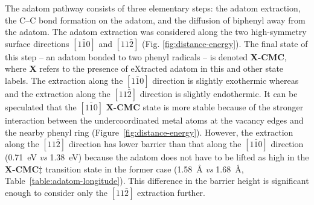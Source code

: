 \documentclass[aps,prb,reprint,amsmath,amssymb]{revtex4-1}
\newcommand{\lock}{\color{red}}
\newcommand{\zhzh}{\color{blue}}
\newcommand{\lock}{\color{black}}
\newcommand{\zhzh}{\color{blue}}
\begin{document}
{\lock

The adatom pathway consists of three elementary steps: the adatom extraction, the C--C bond formation on the adatom, and the diffusion of biphenyl away from the adatom. %
%
The adatom extraction was considered along the two high-symmetry surface directions $[1\bar{1}0]$ and $[11\bar{2}]$ (Fig. \ref{fig:distance-energy}). The final state of this step -- an adatom bonded to two phenyl radicals -- is denoted \textbf{X-CMC}, where \textbf{X} refers to the presence of eXtracted adatom in this and other state labels. 
%
The extraction along the $[1\bar{1}0]$ direction is slightly exothermic whereas and the extraction along the $[11\bar{2}]$ direction is slightly endothermic. It can be speculated that the $[1\bar{1}0]$ \textbf{X-CMC} state is more stable because of the stronger interaction between the undercoordinated metal atoms at the vacancy edges and the nearby phenyl ring (Figure~\ref{fig:distance-energy}).
%
%
However, the extraction along the $[11\bar{2}]$ direction has lower barrier than that along the $[1\bar{1}0]$ direction (\SI{0.71}{\electronvolt} \emph{vs} \SI{1.38}{\electronvolt}) because the adatom does not have to be lifted as high in the \textbf{X-CMC$\ddagger$} transition state in the former case (\SI{1.58}{\angstrom} \emph{vs} \SI{1.68}{\angstrom}, Table~\ref{table:adatom-longitude}). This difference in the barrier height is significant enough to consider only the $[11\bar{2}]$ extraction further.


}
\end{document}
